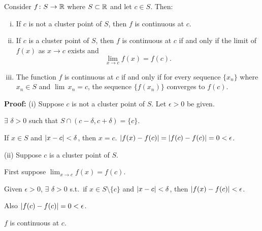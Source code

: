 \documentclass[10pt,aspectratio=169]{beamer}
\begin{document}
\begin{frame}

\begin{proposition}
Consider $f \colon S \to {\mathbb{R}}$ where $S \subset {\mathbb{R}}$
and let $c \in S$.
\pause
Then:
\begin{enumerate}[(i)]
\item If $c$ is not a cluster point of $S$, then $f$ is continuous at $c$.
\item \pause If $c$ is a cluster point of $S$, then $f$ is continuous at $c$
if and only if the limit of $f(x)$ as $x \to c$ exists and
\begin{equation*}
\lim_{x\to c} f(x) = f(c) .
\end{equation*}
\item \pause The function $f$ is continuous at $c$ if and only if for every sequence $\{ x_n \}$
where $x_n \in S$ and $\lim\, x_n = c$, the sequence $\{ f(x_n) \}$ converges
to $f(c)$.
\end{enumerate}
\end{proposition}

\pause

\textbf{Proof:}
(i) Suppose $c$ is not a cluster point of $S$.  Let $\epsilon > 0$ be given.

\pause
$\exists$ $\delta > 0$ such that $S \cap (c-\delta,c+\delta) = \{ c \}$.

\pause
If $x \in S$ and $\left\lvert {x-c} \right\rvert < \delta$, then $x=c$.
\pause
\wthus $\left\lvert {f(x)-f(c)} \right\rvert = \left\lvert {f(c)-f(c)} \right\rvert = 0 < \epsilon$.

\pause
\medskip

(ii)
Suppose $c$ is a cluster point of $S$.

\pause
First suppose $\lim_{x\to c} f(x) = f(c)$.

\pause
Given $\epsilon > 0$, $\exists$ $\delta > 0$ s.t.\ if $x \in S \setminus \{ c \}$
and $\left\lvert {x-c} \right\rvert < \delta$, then $\left\lvert {f(x)-f(c)} \right\rvert < \epsilon$.

\pause
Also $\left\lvert {f(c)-f(c)} \right\rvert = 0 < \epsilon$.

\pause
\thus \quad $f$ is continuous at $c$.

\end{frame}
\end{document}
